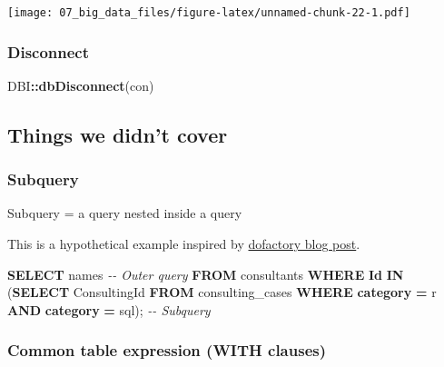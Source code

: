 \documentclass[
]{book}
\newenvironment{Shaded}{\begin{snugshade}}{\end{snugshade}}
\newcommand{\CommentTok}[1]{\textcolor[rgb]{0.56,0.35,0.01}{\textit{#1}}}
\newcommand{\KeywordTok}[1]{\textcolor[rgb]{0.13,0.29,0.53}{\textbf{#1}}}
\newcommand{\NormalTok}[1]{#1}
\newcommand{\OperatorTok}[1]{\textcolor[rgb]{0.81,0.36,0.00}{\textbf{#1}}}
\newcommand{\StringTok}[1]{\textcolor[rgb]{0.31,0.60,0.02}{#1}}
\begin{document}
\texttt{[image: 07\_big\_data\_files/figure-latex/unnamed-chunk-22-1.pdf]}

\hypertarget{disconnect}{%
\subsubsection{Disconnect}\label{disconnect}}

\begin{Shaded}
\begin{Highlighting}[]
\NormalTok{DBI}\OperatorTok{::}\KeywordTok{dbDisconnect}\NormalTok{(con)}
\end{Highlighting}
\end{Shaded}

\hypertarget{things-we-didnt-cover}{%
\subsection{Things we didn't cover}\label{things-we-didnt-cover}}

\hypertarget{subquery}{%
\subsubsection{Subquery}\label{subquery}}

Subquery = a query nested inside a query

This is a hypothetical example inspired by \href{https://www.dofactory.com/sql/subquery}{dofactory blog post}.

\begin{Shaded}
\begin{Highlighting}[]
\KeywordTok{SELECT}\NormalTok{ names  }\CommentTok{{-}{-} Outer query }
\KeywordTok{FROM}\NormalTok{ consultants}
\KeywordTok{WHERE} \KeywordTok{Id} \KeywordTok{IN}\NormalTok{ (}\KeywordTok{SELECT}\NormalTok{ ConsultingId}
                \KeywordTok{FROM}\NormalTok{ consulting\_cases }
                \KeywordTok{WHERE} \KeywordTok{category} \OperatorTok{=} \StringTok{\textquotesingle{}r\textquotesingle{}} \KeywordTok{AND} \KeywordTok{category} \OperatorTok{=} \StringTok{\textquotesingle{}sql\textquotesingle{}}\NormalTok{); }\CommentTok{{-}{-} Subquery }
\end{Highlighting}
\end{Shaded}

\hypertarget{common-table-expression-with-clauses}{%
\subsubsection{Common table expression (WITH clauses)}\label{common-table-expression-with-clauses}}
\end{document}
